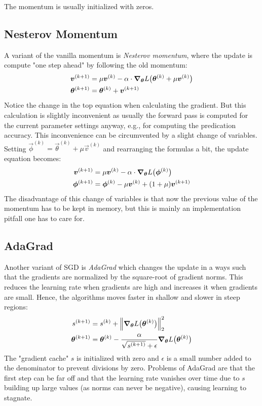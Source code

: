 		The momentum is usually initialized with zeros.

		\subsection{Nesterov Momentum}
			A variant of the vanilla momentum is \emph{Nesterov momentum}, where the update is compute "one step ahead" by following the old momentum:
			\begin{align}
				\bm{v}^{(k + 1)} &= \mu \bm{v}^{(k)} - \alpha \cdot \grad_{\bm{\theta}} L\bigl( \bm{\theta}^{(k)} + \mu \bm{v}^{(k)} \bigr) \\
				\bm{\theta}^{(k + 1)} &= \bm{\theta}^{(k)} + \bm{v}^{(k + 1)}
			\end{align}
			Notice the change in the top equation when calculating the gradient. But this calculation is slightly inconvenient as usually the forward pass is computed for the current parameter settings anyway, e.g., for computing the predication accuracy. This inconvenience can be circumvented by a slight change of variables. Setting \( \vec{\phi}^{(k)} = \vec{\theta}^{(k)} + \mu \vec{v}^{(k)} \) and rearranging the formulas a bit, the update equation becomes:
			\begin{align}
				\bm{v}^{(k + 1)} &= \mu \bm{v}^{(k)} - \alpha \cdot \grad_{\bm{\theta}} L\bigl(\bm{\phi}^{(k)}\bigr) \\
				\bm{\phi}^{(k + 1)} &= \bm{\phi}^{(k)} - \mu \bm{v}^{(k)} + (1 + \mu) \bm{v}^{(k + 1)}
			\end{align}
			The disadvantage of this change of variables is that now the previous value of the momentum has to be kept in memory, but this is mainly an implementation pitfall one has to care for.

		\subsection{AdaGrad}
			Another variant of SGD is \emph{AdaGrad} which changes the update in a ways such that the gradients are normalized by the square-root of gradient norms. This reduces the learning rate when gradients are high and increases it when gradients are small. Hence, the algorithms moves faster in shallow and slower in steep regions:
			\begin{align}
				s^{(k + 1)} &= s^{(k)} + \Big\lVert \grad_{\bm{\theta}} L\bigl(\bm{\theta}^{(k)}\bigr) \Big\rVert_2^2 \\
				\bm{\theta}^{(k + 1)} &= \bm{\theta}^{(k)} - \frac{\alpha}{\sqrt{s^{(k + 1)}} + \epsilon} \grad_{\bm{\theta}} L\bigl(\bm{\theta}^{(k)}\bigr)
			\end{align}
			The "gradient cache" \(s\) is initialized with zero and \(\epsilon\) is a small number added to the denominator to prevent divisions by zero. Problems of AdaGrad are that the first step can be far off and that the learning rate vanishes over time due to \(s\) building up large values (as norms can never be negative), causing learning to stagnate.


